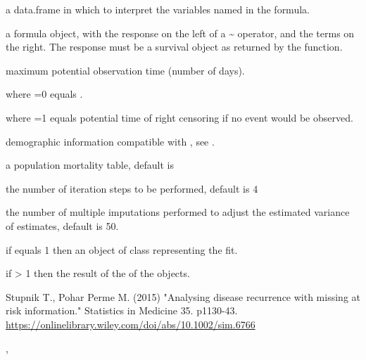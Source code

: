 \documentclass[a4paper]{book}
\begin{document}
\begin{Arguments}
\begin{ldescription}
\item[\code{data}] a data.frame in which to interpret the variables named in the
formula.

\item[\code{f}] a formula object, with the response on the left of a \textasciitilde{} operator,
and the terms on the right. The response must be a survival object as
returned by the  function.

\item[\code{maxtime}] maximum potential observation time (number of days).

where =0 equals .

where =1 equals potential time of right censoring if no event
would be observed.

\item[\code{D}] demographic information compatible with , see
.

\item[\code{ratetable}] a population mortality table, default is 

\item[\code{iterations}] the number of iteration steps to be performed, default is
4

\item[\code{R}] the number of multiple imputations performed to adjust the
estimated variance of estimates, default is 50.
\end{ldescription}
\end{Arguments}
%
\begin{Value}
if  equals 1 then an object of class
 representing the fit.

if  > 1 then the result of the  of
the  objects.
\end{Value}
%
\begin{References}\relax
Stupnik T., Pohar Perme M. (2015) "Analysing disease recurrence
with missing at risk information." Statistics in Medicine 35. p1130-43.
\url{https://onlinelibrary.wiley.com/doi/abs/10.1002/sim.6766}
\end{References}
%
\begin{SeeAlso}\relax
{}, 
\end{SeeAlso}
\end{document}
